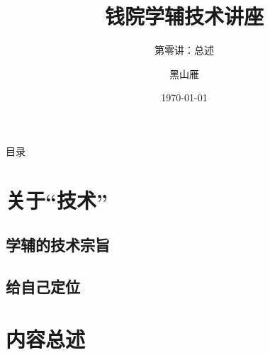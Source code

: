 \documentclass{beamer}
\title[Tech Lec]{钱院学辅技术讲座}
\subtitle{第零讲：总述}
\author[xjtu-blacksmith]{黑山雁}
\institute[Xi'an Jiaotong University]
{
  西安交通大学
}
\date{\today}
\begin{document}
\begin{frame}
\maketitle
\end{frame}

\begin{frame}{目录}
    \tableofcontents
\end{frame}

\section{关于“技术”}
\subsection{学辅的技术宗旨}
\subsection{给自己定位}

\section{内容总述}
\end{document}

